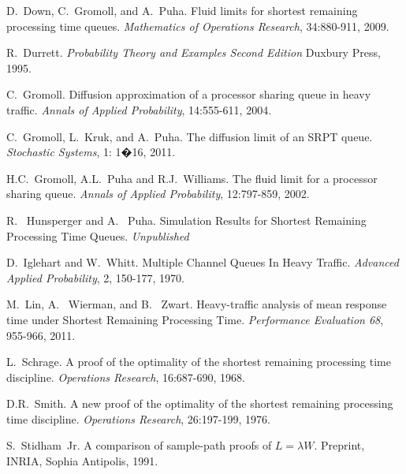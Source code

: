 \documentclass[12pt]{article}
\theoremstyle{plain}
\theoremstyle{definition}
\theoremstyle{remark}
\begin{document}
\begin{thebibliography}{20}

 D.\ Down, C.\ Gromoll, and A.\ Puha. 
Fluid limits for shortest remaining processing time queues.
{\em Mathematics of Operations Research}, 34:880-911, 2009.

 R.\ Durrett.
{\em Probability Theory and Examples Second Edition}
Duxbury Press, 1995.

 C.\ Gromoll.
Diffusion approximation of a processor sharing queue in heavy traffic.
{\em Annals of Applied Probability}, 14:555-611, 2004.

 C.\ Gromoll, L.\ Kruk, and A.\ Puha.
The diffusion limit of an SRPT queue.
{\em Stochastic Systems}, 1: 1�16, 2011.

 H.C.\ Gromoll, A.L.\ Puha and R.J.\ Williams.
The fluid limit for a processor sharing queue.
{\em Annals of Applied Probability}, 12:797-859, 2002.

 R. \ Hunsperger and A. \ Puha.
Simulation Results for Shortest Remaining Processing Time Queues.
{\em Unpublished}

 D.\ Iglehart and W.\ Whitt.
Multiple Channel Queues In Heavy Traffic.
{\em Advanced Applied Probability}, 2, 150-177, 1970.

 M.\ Lin, A. \ Wierman, and B. \ Zwart.
Heavy-traffic analysis of mean response time under Shortest Remaining Processing Time.
{\em Performance Evaluation 68}, 955-966, 2011.

 L.\ Schrage.
A proof of the optimality of the shortest remaining processing time discipline.
{\em Operations Research}, 16:687-690, 1968.

 D.R.\ Smith.
A new proof of the optimality of the shortest remaining processing time discipline.
{\em Operations Research}, 26:197-199, 1976.

 S.\ Stidham\ Jr.
A comparison of sample-path proofs of $L = \lambda W$. Preprint,
INRIA, Sophia Antipolis, 1991.

\end{thebibliography}
\end{document}
